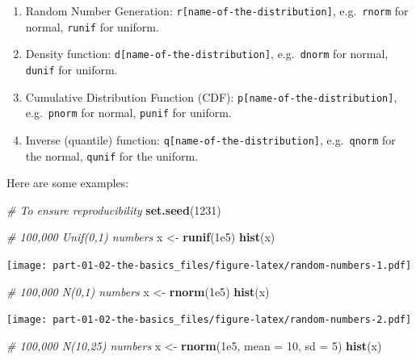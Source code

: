 \documentclass[]{book}
\newenvironment{Shaded}{\begin{snugshade}}{\end{snugshade}}
\newcommand{\CommentTok}[1]{\textcolor[rgb]{0.56,0.35,0.01}{\textit{#1}}}
\newcommand{\DataTypeTok}[1]{\textcolor[rgb]{0.13,0.29,0.53}{#1}}
\newcommand{\DecValTok}[1]{\textcolor[rgb]{0.00,0.00,0.81}{#1}}
\newcommand{\FloatTok}[1]{\textcolor[rgb]{0.00,0.00,0.81}{#1}}
\newcommand{\KeywordTok}[1]{\textcolor[rgb]{0.13,0.29,0.53}{\textbf{#1}}}
\newcommand{\NormalTok}[1]{#1}
\newcommand{\StringTok}[1]{\textcolor[rgb]{0.31,0.60,0.02}{#1}}
\providecommand{\tightlist}{%
  \setlength{\itemsep}{0pt}\setlength{\parskip}{0pt}}
\begin{document}
\begin{enumerate}
  \begin{enumerate}
  \def\labelenumii{\alph{enumii}.}
  \tightlist
  \item
    Random Number Generation: \texttt{r{[}name-of-the-distribution{]}}, e.g.~\texttt{rnorm} for normal, \texttt{runif} for uniform.
  \item
    Density function: \texttt{d{[}name-of-the-distribution{]}}, e.g.~\texttt{dnorm} for normal, \texttt{dunif} for uniform.
  \item
    Cumulative Distribution Function (CDF): \texttt{p{[}name-of-the-distribution{]}}, e.g.~\texttt{pnorm} for normal, \texttt{punif} for uniform.
  \item
    Inverse (quantile) function: \texttt{q{[}name-of-the-distribution{]}}, e.g.~\texttt{qnorm} for the normal, \texttt{qunif} for the uniform.
  \end{enumerate}

  Here are some examples:

\begin{Shaded}
\begin{Highlighting}[]
\CommentTok{# To ensure reproducibility}
\KeywordTok{set.seed}\NormalTok{(}\DecValTok{1231}\NormalTok{)}

\CommentTok{# 100,000 Unif(0,1) numbers}
\NormalTok{x <-}\StringTok{ }\KeywordTok{runif}\NormalTok{(}\FloatTok{1e5}\NormalTok{)}
\KeywordTok{hist}\NormalTok{(x)}
\end{Highlighting}
\end{Shaded}

  \texttt{[image: part-01-02-the-basics\_files/figure-latex/random-numbers-1.pdf]}

\begin{Shaded}
\begin{Highlighting}[]
\CommentTok{# 100,000 N(0,1) numbers}
\NormalTok{x <-}\StringTok{ }\KeywordTok{rnorm}\NormalTok{(}\FloatTok{1e5}\NormalTok{)}
\KeywordTok{hist}\NormalTok{(x)}
\end{Highlighting}
\end{Shaded}

  \texttt{[image: part-01-02-the-basics\_files/figure-latex/random-numbers-2.pdf]}

\begin{Shaded}
\begin{Highlighting}[]
\CommentTok{# 100,000 N(10,25) numbers}
\NormalTok{x <-}\StringTok{ }\KeywordTok{rnorm}\NormalTok{(}\FloatTok{1e5}\NormalTok{, }\DataTypeTok{mean =} \DecValTok{10}\NormalTok{, }\DataTypeTok{sd =} \DecValTok{5}\NormalTok{)}
\KeywordTok{hist}\NormalTok{(x)}
\end{Highlighting}
\end{Shaded}


\end{enumerate}
\end{document}
